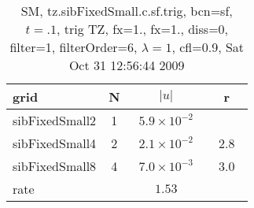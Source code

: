 \begin{table}[hbt]\tableFont %
\begin{center}
\begin{tabular}{|l|c|c|c|} \hline 
grid  & N &  $\vert u \vert$   & r \\ \hline 
      sibFixedSmall2 &     1 & ~$5.9\times10^{ -2}$~ &            \\ \hline
      sibFixedSmall4 &     2 & ~$2.1\times10^{ -2}$~ & ~$  2.8$~  \\ \hline
      sibFixedSmall8 &     4 & ~$7.0\times10^{ -3}$~ & ~$  3.0$~  \\ \hline
    rate             &       &       $1.53$         &        \\ \hline
\end{tabular}
\caption{SM, tz.sibFixedSmall.c.sf.trig, bcn=sf, $t=.1$, trig TZ, fx=1., fx=1., diss=0, filter=1, filterOrder=6, $\lambda=1$, cfl=0.9,  Sat Oct 31 12:56:44 2009}\label{table:tz.sibFixedSmall.c.sf.trig}
\end{center}
\end{table}
